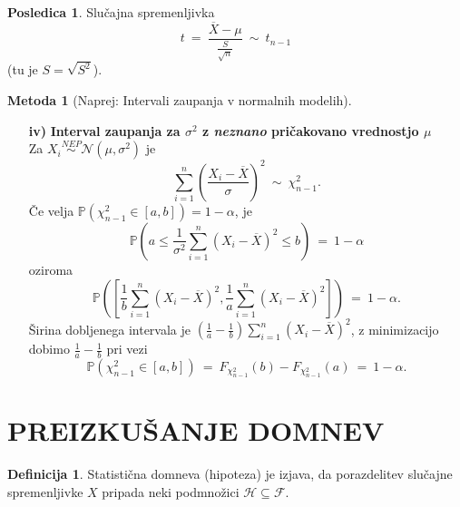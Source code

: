\documentclass[11pt]{article}
\newcommand{\p}{\mathbb{P}}
\newcommand{\1}{\mathbbm{1}}
\newcommand{\n}{\mathcal{N}}
\newcommand{\F}{\mathcal{F}}
\newcommand{\h}{\mathcal{H}}
\theoremstyle{definition}
\newtheorem{definicija}{Definicija}[section]
\theoremstyle{definition}
\theoremstyle{definition}
\newtheorem*{posledica}{Posledica}
\newtheorem{metoda}{Metoda}
\begin{document}
\begin{posledica}

Slučajna spremenljivka
$$t ~=~ \frac{\overline{X} - \mu}{\frac{S}{\sqrt{n}}} ~\sim~ t_{n-1}$$
(tu je $S = \sqrt{S^2}$).

\end{posledica}
\vspace{0.5cm}

\begin{metoda}[Naprej: Intervali zaupanja v normalnih modelih]
~\\
\begin{enumerate}

\item[\textbf{iv)}] \textbf{Interval zaupanja za $\sigma^2$ z \textit{neznano} pričakovano vrednostjo $\mu$} \\
\noindent Za $X_i \overset{NEP}{\sim} \n(\mu, \sigma^2)$ je 
$$\sum_{i=1}^n \left(\frac{X_i - \overline{X}}{\sigma}\right)^2 ~\sim~ \chi_{n-1}^2.$$
Če velja $\p(\chi_{n-1}^2 \in [a, b]) = 1-\alpha$, je
$$\p\left(a \leq \frac{1}{\sigma^2}\sum_{i=1}^n(X_i - \overline{X})^2 \leq b\right) ~=~ 1 - \alpha$$
oziroma
$$\p\left(\left[\frac{1}{b}\sum_{i=1}^n(X_i - \overline{X})^2, \frac{1}{a}\sum_{i=1}^n(X_i - \overline{X})^2\right]\right) ~=~ 1 - \alpha.$$
Širina dobljenega intervala je $\left(\frac{1}{a}-\frac{1}{b}\right)\sum_{i=1}^n(X_i - \overline{X})^2$, z minimizacijo dobimo $\frac{1}{a}-\frac{1}{b}$ pri vezi
$$\p(\chi_{n-1}^2 \in [a, b]) ~=~ F_{\chi_{n-1}^2}(b) - F_{\chi_{n-1}^2}(a) ~=~ 1 - \alpha.$$

\end{enumerate}

\end{metoda}
\vspace{0.5cm}

\pagebreak


\section{PREIZKUŠANJE DOMNEV}
\vspace{0.5cm}

\begin{definicija}

Statistična domneva (hipoteza) je izjava, da porazdelitev slučajne spremenljivke $X$ pripada neki podmnožici $\h \subseteq \F$.

\end{definicija}
\vspace{0.5cm}
\end{document}
